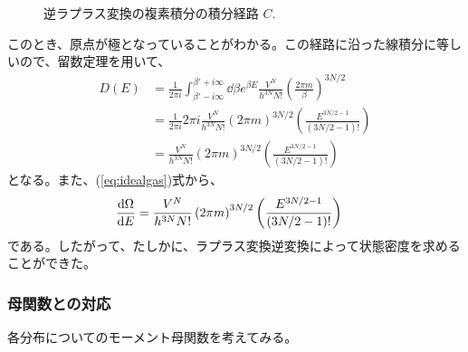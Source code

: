 \documentclass[a4paper,11pt]{jsarticle}
\numberwithin{equation}{section}
\begin{document}
\begin{figure}[H]
  \centering
  \caption{逆ラプラス変換の複素積分の積分経路 $C$.}
  \end{figure}
このとき、原点が極となっていることがわかる。この経路に沿った線積分に等しいので、留数定理を用いて、
\begin{align}
  D(E) &= \frac{1}{2\pi i}\int_{\beta' - i\infty}^{\beta' + i\infty}\dd \beta e^{\beta E}\frac{V^N}{h^{3N}N!}\left( \frac{2\pi m}{\beta} \right)^{3N/2}\\
  &= \frac{1}{2\pi i} 2\pi i \frac{V^N}{h^{3N}N!}\left(2\pi m\right)^{3N/2}\left(\frac{E^{3N/2-1}}{(3N/2-1)!}\right)\\
  &= \frac{V^N}{h^{3N}N!}\left(2\pi m\right)^{3N/2}\left(\frac{E^{3N/2-1}}{(3N/2-1)!}\right)
\end{align}
となる。また、(\ref{eq:idealgas})式から、
\begin{align}
  \dv{\Omega}{E} &= \frac{V^N}{h^{3N}N!}\left(2\pi m\right)^{3N/2}\left(\frac{E^{3N/2-1}}{(3N/2-1)!}\right)
\end{align}
である。したがって、たしかに、ラプラス変換逆変換によって状態密度を求めることができた。


\subsubsection{母関数との対応}
各分布についてのモーメント母関数を考えてみる。\\
\end{document}
